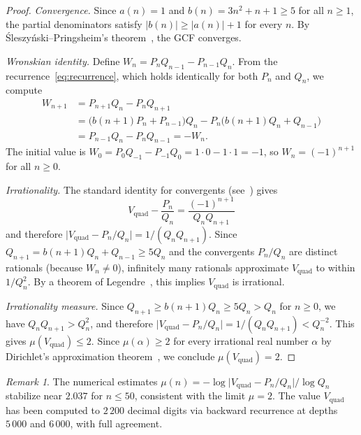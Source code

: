 \documentclass[11pt,a4paper]{article}
\theoremstyle{definition}
\theoremstyle{remark}
\newtheorem{remark}[theorem]{Remark}
\newcommand{\Vq}{V_{\mathrm{quad}}}
\newcommand{\abs}[1]{\lvert #1 \rvert}
\begin{document}
\begin{proof}
\emph{Convergence.}
Since $a(n) = 1$ and $b(n) = 3n^2 + n + 1 \ge 5$ for all $n \ge 1$,
the partial denominators satisfy $\abs{b(n)} \ge \abs{a(n)} + 1$
for every $n$.  By \'Sleszyński--Pringsheim's
theorem~\cite{lorentzen2008}, the GCF converges.

\emph{Wronskian identity.}
Define $W_n = P_n Q_{n-1} - P_{n-1} Q_n$.
From the recurrence~\eqref{eq:recurrence}, which holds identically
for both $P_n$ and $Q_n$, we compute
\begin{align*}
  W_{n+1} &= P_{n+1} Q_n - P_n Q_{n+1} \\
  &= \bigl( b(n{+}1) P_n + P_{n-1} \bigr) Q_n
   - P_n \bigl( b(n{+}1) Q_n + Q_{n-1} \bigr) \\
  &= P_{n-1} Q_n - P_n Q_{n-1}
  = -W_n.
\end{align*}
The initial value is $W_0 = P_0 Q_{-1} - P_{-1} Q_0
= 1 \cdot 0 - 1 \cdot 1 = -1$, so $W_n = (-1)^{n+1}$ for
all $n \ge 0$.

\emph{Irrationality.}
The standard identity for convergents
(see~\cite[Theorem~1.1]{lorentzen2008}) gives
\[
  \Vq - \frac{P_n}{Q_n}
  = \frac{(-1)^{n+1}}{Q_n Q_{n+1}}
\]
and therefore $\abs{\Vq - P_n / Q_n} = 1 / (Q_n Q_{n+1})$.
Since $Q_{n+1} = b(n{+}1) Q_n + Q_{n-1} \ge 5 Q_n$ and the
convergents $P_n / Q_n$ are distinct rationals (because $W_n \ne 0$),
infinitely many rationals approximate $\Vq$ to within $1/Q_n^2$.
By a theorem of Legendre~\cite{bugeaud2012}, this implies $\Vq$
is irrational.

\emph{Irrationality measure.}
Since $Q_{n+1} \ge b(n{+}1) Q_n \ge 5 Q_n > Q_n$ for $n \ge 0$,
we have $Q_n Q_{n+1} > Q_n^2$, and therefore
$\abs{\Vq - P_n/Q_n} = 1/(Q_n Q_{n+1}) < Q_n^{-2}$.
This gives $\mu(\Vq) \le 2$.
Since $\mu(\alpha) \ge 2$ for every irrational real number $\alpha$
by Dirichlet's approximation
theorem~\cite[Theorem~1.1]{bugeaud2012},
we conclude $\mu(\Vq) = 2$.
\end{proof}

\begin{remark}
The numerical estimates $\mu(n) = -\log \abs{\Vq - P_n/Q_n} / \log Q_n$
stabilize near $2.037$ for $n \le 50$, consistent with the limit
$\mu = 2$.  The value $\Vq$ has been computed to $2\,200$ decimal
digits via backward recurrence at depths $5\,000$ and $6\,000$,
with full agreement.
\end{remark}


\end{document}
